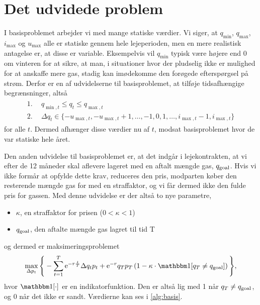 \section{Det udvidede problem} \label{kap:udvidet_problem}

I basisproblemet arbejder vi med mange statiske værdier. Vi siger, at $q_{\min}$, $q_{\max}$, $i_{\max}$ og $u_{\max}$ alle er statiske gennem hele lejeperioden, men en mere realistisk antagelse er, at disse er variable. Eksempelvis vil $q_{\min}$ typisk være højere end 0 om vinteren for at sikre, at man, i situationer hvor der pludselig ikke er mulighed for at anskaffe mere gas, stadig kan imødekomme den forøgede efterspørgsel på strøm. Derfor er en af udvidelserne til basisproblemet, at tilføje tidsafhængige begrænsninger, altså
\begin{align}
\begin{split}
\textrm{1.}& \ \ q_{\min,t} \leq q_{t} \leq q_{\max,t} \\
\textrm{2.}& \ \ \Delta q_{t} \in \{-u_{\max,t}, -u_{\max,t} + 1, \dotsc, -1, 0, 1, \dotsc, i_{\max,t} -1, i_{\max,t} \}
\end{split}
\end{align}
for alle $t$. Dermed afhænger disse værdier nu af $t$, modsat basisproblemet hvor de var statiske hele året. 

Den anden udvidelse til basisproblemet er, at det indgår i lejekontrakten, at vi efter de 12 måneder skal aflevere lageret med en aftalt mængde gas, $q_{\textrm{goal}}$. Hvis vi ikke formår at opfylde dette krav, reduceres den pris, modparten køber den resterende mængde gas for med en straffaktor, og vi får dermed ikke den fulde pris for gassen. Med denne udvidelse er der altså to nye parametre,
\begin{itemize}
\item $\kappa$, en straffaktor for prisen ($0 < \kappa < 1$)
\item $q_{\textrm{goal}}$, den aftalte mængde gas lagret til tid T
\end{itemize}
og dermed er maksimeringsproblemet
\begin{equation}
\max_{\Delta p_{t}} \Bigg\{ -\sum_{t=1}^{T} \mathrm{e}^{-r\frac{t}{T}} \Delta q_{t} p_{t}+ \mathrm{e}^{-r}q_{T}p_{T} \left (1- \kappa \cdot \ind [q_{T} \neq q_{\goal}] \right )  \Bigg\}, 
\end{equation}
hvor $\ind [\cdot]$ er en indikatorfunktion. Den er altså lig med 1 når $q_{T} \neq q_{\textrm{goal}}$, og 0 når det ikke er sandt. Værdierne kan ses i \autoref{alg:basis}.
